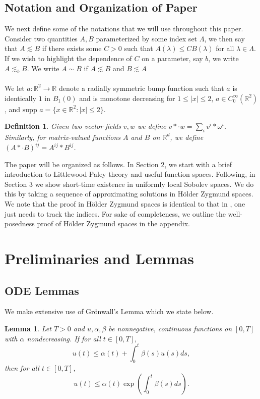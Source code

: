 \documentclass[12pt,xcolor=svgnames]{amsart}
\newtheorem{lemma}[theorem]{Lemma}
\newtheorem{definition}[theorem]{Definition}
\newcommand{\R}{\mathbb{R}}
\newcommand{\abs}[1]{\mid\!#1\!\mid}
\begin{document}
\subsection{Notation and Organization of Paper}
We next define some of the notations that we will use throughout this paper. Consider two quantities $A,B$ parameterized by some index set $\Lambda$, we then say that $A \lesssim B$ if there exists some $C>0$ such that $A(\lambda) \leq CB(\lambda)$ for all $\lambda \in \Lambda$. If we wish to highlight the dependence of $C$ on a parameter, say $b$, we write $A \lesssim_b B$.  We write $A \sim B$ if $A \lesssim B$ and $B \lesssim A$
\\
\\
We let $a:\R^2 \to \R$ denote a radially symmetric bump function such that $a$ is identically $1$ in $B_1(0)$ and is monotone decreasing for $1 \leq \abs{x} \leq 2$, $a \in C_0^{\infty}(\R^2)$, and $\text{supp } a = \{x \in \R^2: \abs{x} \leq 2\}$. 
\begin{definition}
\label{vector convolution definition}Given two vector fields $v,w$ we define $v \ast \cdot w = \sum_i v^i \ast \omega^i$. Similarly, for matrix-valued functions $A$ and $B$ on $\R^d$, we define $(A\ast\cdot B)^{ij}=A^{ij}\ast B^{ij}$.
\end{definition}
The paper will be organized as follows. In Section 2, we start with a brief introduction to Littlewood-Paley theory and useful function spaces. Following, in Section 3 we show short-time existence in uniformly local Sobolev spaces. We do this by taking a sequence of approximating solutions in Hölder Zygmund spaces. We note that the proof in Hölder Zygmund spaces is identical to that in \cite{1}, one just needs to track the indices. For sake of completeness, we outline the well-posedness proof of Hölder Zygmund spaces in the appendix.
\section{Preliminaries and Lemmas}

\subsection{ODE Lemmas} We make extensive use of Grönwall's Lemma which we state below.
\begin{lemma}
Let $T>0$ and $u,\alpha,\beta$ be nonnegative, continuous functions on $[0,T]$ with $\alpha$ nondecreasing. If for all $t\in[0,T],$
$$
u(t) \leq \alpha(t)+\int_0^t\beta(s)u(s)ds,
$$
then for all $t\in [0,T]$,
$$
u(t)\leq\alpha(t)\exp\left(\int_0^t \beta(s)ds\right).
$$
\end{lemma}
\end{document}
